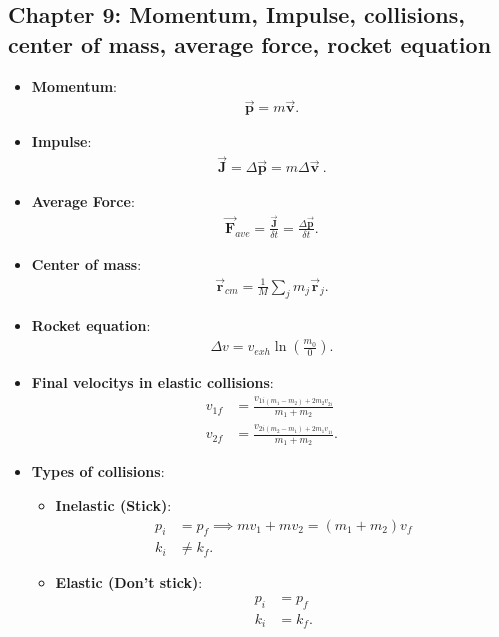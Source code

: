 \documentclass{report}
\begin{document}
    \pagebreak 
    \subsection{Chapter 9: Momentum, Impulse, collisions, center of mass, average force, rocket equation}
    \begin{itemize}
        \item \textbf{Momentum}:
            \begin{align*}
                \vec{\mathbf{p}} = m\vec{\mathbf{v}}
            .\end{align*}
        \item \textbf{Impulse}:
            \begin{align*}
                \vec{\mathbf{J}} = \Delta \vec{\mathbf{p}} = m\Delta \vec{\mathbf{v}}\
            .\end{align*}
        \item \textbf{Average Force}:
            \begin{align*}
                \vec{\mathbf{F}}_{ave } = \frac{\vec{\mathbf{J}}}{\delta t} = \frac{\Delta \vec{\mathbf{p}}}{\delta t}
            .\end{align*}
        \item \textbf{Center of mass}:
            \begin{align*}
                \vec{\mathbf{r}}_{cm} = \frac{1}{M}\sum_jm_{j}\vec{\mathbf{r}}_{j}
            .\end{align*}
        \item \textbf{Rocket equation}:
            \begin{align*}
                \Delta v = v_{exh}\ln{\left(\frac{m_{0}}{0}\right)}
            .\end{align*}
        \item \textbf{Final velocitys in elastic collisions}:
            \begin{align*}
                v_{1f} &= \frac{v_{1i(m_{1} - m_{2}) + 2m_{2}v_{2i}}}{m_{1} + m_{2}}\\
                v_{2f} &= \frac{v_{2i(m_{2} - m_{1}) + 2m_{1}v_{1i}}}{m_{1} + m_{2}}
            .\end{align*}
        \item \textbf{Types of collisions}:
            \begin{itemize}
                \item \textbf{Inelastic (Stick)}:
                    \begin{align*}
                        p_{i} &= p_{f} \implies mv_{1} + mv_{2} = (m_{1} + m_{2})v_{f}\\
                        k_{i} &\neq k_{f}
                    .\end{align*}
                \item \textbf{Elastic (Don't stick)}:
                    \begin{align*}
                        p_{i} &= p_{f} \\
                        k_{i} &= k_{f}
                    .\end{align*}
            \end{itemize}
    \end{itemize}
\end{document}
